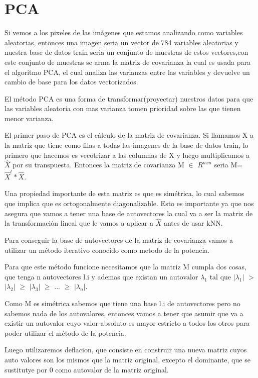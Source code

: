 \section{PCA}
Si vemos a los pixeles de las imágenes que estamos analizando como variables aleatorias, entonces una imagen seria un vector de 784 variables aleatorias y nuestra base de datos train seria un conjunto de muestras de estos vectores,con este conjunto de muestras se arma la matriz de covarianza la cual es usada para el algoritmo PCA, el cual analiza las varianzas entre las variables y devuelve un cambio de base para los datos vectorizados. \par
\indent El método PCA es una forma de transformar(proyectar) nuestros datos para que las variables aleatoria con mas varianza tomen prioridad sobre las que tienen menor varianza.\par
\indent El primer paso de PCA es el cálculo de la matriz de covarianza. Si llamamos X a la matriz que tiene como filas a todas las imagenes de la base de datos train, lo primero que hacemos es vecotrizar a las columnas de X y luego multiplicamos a $\hat{X}$ por su transpuesta. Entonces la matriz de covarianza M $\in$ $R^{nxn}$  seria M=$\hat{X}^{t}*\hat{X}$. \par
\indent Una propiedad importante de esta matriz es que es simétrica, lo cual sabemos que implica que es ortogonalmente diagonalizable. Esto es importante ya que nos asegura que vamos a tener una base de autovectores la cual va a ser la matriz de la transformación lineal que le vamos a aplicar a $\hat{X}$ antes de usar kNN. \par
\indent Para conseguir la base de autovectores de la matriz de covarianza vamos a utilizar un método iterativo conocido como metodo de la potencia. \par
\indent Para que este método funcione necesitamos que la matriz M cumpla dos cosas, que tenga n autovectores l.i y ademas que existan un autovalor $\lambda_1$ tal que $|\lambda_1|$ $>$ $|\lambda_2|$ $\geq$ $|\lambda_3|$ $\geq$ ... $\geq$ $|\lambda_n|$. \par
\indent Como M es simétrica sabemos que tiene una base l.i de autovectores pero no sabemos nada de los autovalores, entonces vamos a tener que asumir que va a existir un autovalor cuyo valor absoluto es mayor estricto a todos los otros para poder utilizar el método de la potencia.\par
\indent Luego utilizaremos deflacion, que consiste en construir una nueva matriz cuyos auto valores 	son los mismos que la matriz original, excepto el dominante, que se sustitutye por 0 como autovalor de la matriz original.\par
